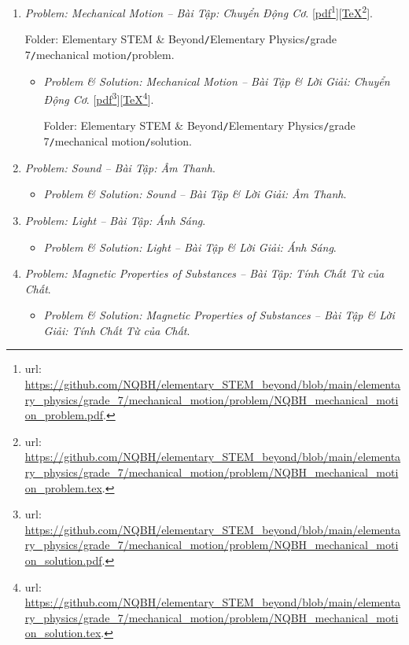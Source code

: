 \documentclass[12pt,twoside]{book}
\begin{document}
\begin{enumerate}
	\item {\it Problem: Mechanical Motion -- Bài Tập: Chuyển Động Cơ}. [\href{https://github.com/NQBH/elementary_STEM_beyond/blob/main/elementary_physics/grade_7/mechanical_motion/problem/NQBH_mechanical_motion_problem.pdf}{pdf}\footnote{{\sc url}: \url{https://github.com/NQBH/elementary_STEM_beyond/blob/main/elementary_physics/grade_7/mechanical_motion/problem/NQBH_mechanical_motion_problem.pdf}.}][\href{https://github.com/NQBH/elementary_STEM_beyond/blob/main/elementary_physics/grade_7/mechanical_motion/problem/NQBH_mechanical_motion_problem.tex}{\TeX}\footnote{{\sc url}: \url{https://github.com/NQBH/elementary_STEM_beyond/blob/main/elementary_physics/grade_7/mechanical_motion/problem/NQBH_mechanical_motion_problem.tex}.}].
	
	Folder: {\sf Elementary STEM \& Beyond{\tt/}Elementary Physics{\tt/}grade 7{\tt/}mechanical motion{\tt/}problem}.	
	\begin{itemize}
		\item {\it Problem \& Solution: Mechanical Motion -- Bài Tập \& Lời Giải: Chuyển Động Cơ}. [\href{https://github.com/NQBH/elementary_STEM_beyond/blob/main/elementary_physics/grade_7/mechanical_motion/problem/NQBH_mechanical_motion_solution.pdf}{pdf}\footnote{{\sc url}: \url{https://github.com/NQBH/elementary_STEM_beyond/blob/main/elementary_physics/grade_7/mechanical_motion/problem/NQBH_mechanical_motion_solution.pdf}.}][\href{https://github.com/NQBH/elementary_STEM_beyond/blob/main/elementary_physics/grade_7/mechanical_motion/problem/NQBH_mechanical_motion_solution.tex}{\TeX}\footnote{{\sc url}: \url{https://github.com/NQBH/elementary_STEM_beyond/blob/main/elementary_physics/grade_7/mechanical_motion/problem/NQBH_mechanical_motion_solution.tex}.}].
		
		Folder: {\sf Elementary STEM \& Beyond{\tt/}Elementary Physics{\tt/}grade 7{\tt/}mechanical motion{\tt/}solution}.
	\end{itemize}
	\item {\it Problem: Sound -- Bài Tập: Âm Thanh}.
	\begin{itemize}
		\item {\it Problem \& Solution: Sound -- Bài Tập \& Lời Giải: Âm Thanh}.
	\end{itemize}
	\item {\it Problem: Light -- Bài Tập: Ánh Sáng}.
	\begin{itemize}
		\item {\it Problem \& Solution: Light -- Bài Tập \& Lời Giải: Ánh Sáng}.
	\end{itemize}
	\item {\it Problem: Magnetic Properties of Substances -- Bài Tập: Tính Chất Từ của Chất}.
	\begin{itemize}
		\item {\it Problem \& Solution: Magnetic Properties of Substances -- Bài Tập \& Lời Giải: Tính Chất Từ của Chất}.
	\end{itemize}
\end{enumerate}
\end{document}
